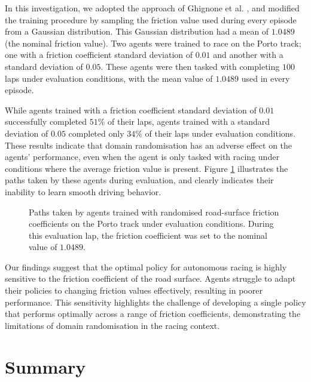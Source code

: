 In this investigation, we adopted the approach of Ghignone et al. \cite{Ghignone2022}, and modified the training procedure by sampling the friction value used during every episode from a Gaussian distribution.
This Gaussian distribution had a mean of $1.0489$ (the nominal friction value).
Two agents were trained to race on the Porto track; one with a friction coefficient standard deviation of $0.01$ and another with a standard deviation of $0.05$.
These agents were then tasked with completing $100$ laps under evaluation conditions, with the mean value of $1.0489$ used in every episode.

While agents trained with a friction coefficient standard deviation of $0.01$ successfully completed $51\%$ of their laps, agents trained with a standard deviation of $0.05$ completed only $34\%$ of their laps under evaluation conditions.
These results indicate that domain randomisation has an adverse effect on the agents' performance, even when the agent is only tasked with racing under conditions where the average friction value is present.
Figure \ref{fig:porto_domain_random} illustrates the paths taken by these agents during evaluation, and clearly indicates their inability to learn smooth driving behavior. 


\begin{figure}[htb!]
    \centering
    
    \caption[Paths taken by agents trained with randomised road-surface friction coefficients on the Porto track under evaluation conditions]{Paths taken by agents trained with randomised road-surface friction coefficients on the Porto track under evaluation conditions. During this evaluation lap, the friction coefficient was set to the nominal value of $1.0489$.}
    \label{fig:porto_domain_random}
\end{figure}


Our findings suggest that the optimal policy for autonomous racing is highly sensitive to the friction coefficient of the road surface. 
Agents struggle to adapt their policies to changing friction values effectively, resulting in poorer performance. 
This sensitivity highlights the challenge of developing a single policy that performs optimally across a range of friction coefficients, demonstrating the limitations of domain randomisation in the racing context.



\section{Summary}

